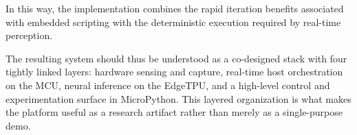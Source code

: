 In this way, the implementation combines the rapid iteration benefits
associated with embedded scripting with the deterministic execution
required by real-time perception.

The resulting system should thus be understood as a co-designed stack
with four tightly linked layers: hardware sensing and capture, real-time
host orchestration on the MCU, neural inference on the EdgeTPU, and a
high-level control and experimentation surface in MicroPython. This
layered organization is what makes the platform useful as a research
artifact rather than merely as a single-purpose demo.
